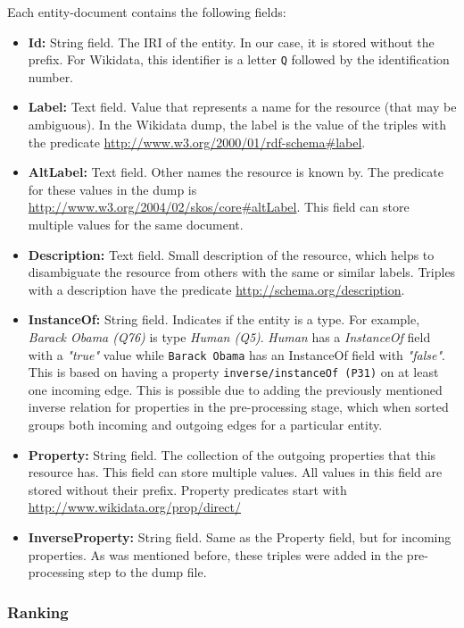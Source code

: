 Each entity-document contains the following fields:
\begin{itemize}
    \item \textbf{Id:} String field. The IRI of the entity. In our case, it is stored without the prefix. For Wikidata, this identifier is a letter \texttt{Q} followed by the identification number.
    \item \textbf{Label:} Text field.  Value that represents a name for the resource (that may be ambiguous).  In the Wikidata dump, the label is the value of the triples with the predicate \url{http://www.w3.org/2000/01/rdf-schema#label}. 
    \item \textbf{AltLabel:} Text field. Other names the resource is known by.  The predicate for these values in the dump is \url{http://www.w3.org/2004/02/skos/core#altLabel}. This field can store multiple values for the same document.
    \item \textbf{Description:} Text field. Small description of the resource, which helps to disambiguate the resource from others with the same or similar labels. Triples with a description have the predicate \url{http://schema.org/description}.
    \item \textbf{InstanceOf:} String field. Indicates if the entity is a type. For example, \textit{Barack Obama (Q76)} is type \textit{Human (Q5)}. \textit{Human} has a \textit{InstanceOf} field with a \textit{"true"} value while \texttt{Barack Obama} has an InstanceOf field with \textit{"false"}. This is based on having a property \texttt{inverse/instanceOf (P31)} on at least one incoming edge. This is possible due to adding the previously mentioned inverse relation for properties in the pre-processing stage, which when sorted groups both incoming and outgoing edges for a particular entity.
    \item \textbf{Property:} String field. The collection of the outgoing properties that this resource has. This field can store multiple values. All values in this field are stored without their prefix. Property predicates start with  \url{http://www.wikidata.org/prop/direct/}
    \item \textbf{InverseProperty:} String field. Same as the Property field, but for incoming properties. As was mentioned before, these triples were added in the pre-processing step to the dump file.
\end{itemize}

\subsubsection{Ranking}

